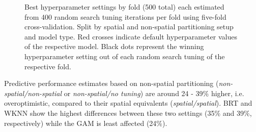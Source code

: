 \documentclass[review]{elsarticle}
\begin{document}
\begin{figure} [H]
	\begin{center}
		\caption[]{Best hyperparameter settings by fold (500 total) each estimated from 400 random search tuning iterations per fold using five-fold cross-validation. Split by spatial and non-spatial partitioning setup and model type.
			Red crosses indicate default hyperparameter values of the respective model.
			Black dots represent the winning hyperparameter setting out of each random search tuning of the respective fold.}
		\label{fig:best_parameter_combs}
	\end{center}
\end{figure}

Predictive performance estimates based on non-spatial partitioning (\emph{non-spatial/non-spatial} or \emph{non-spatial/no tuning}) are around 24 - 39\% higher, i.e. overoptimistic, compared to their spatial equivalents (\emph{spatial/spatial}).
BRT and WKNN show the highest differences between these two settings (35\% and 39\%, respectively) while the GAM is least affected (24\%).
\end{document}
